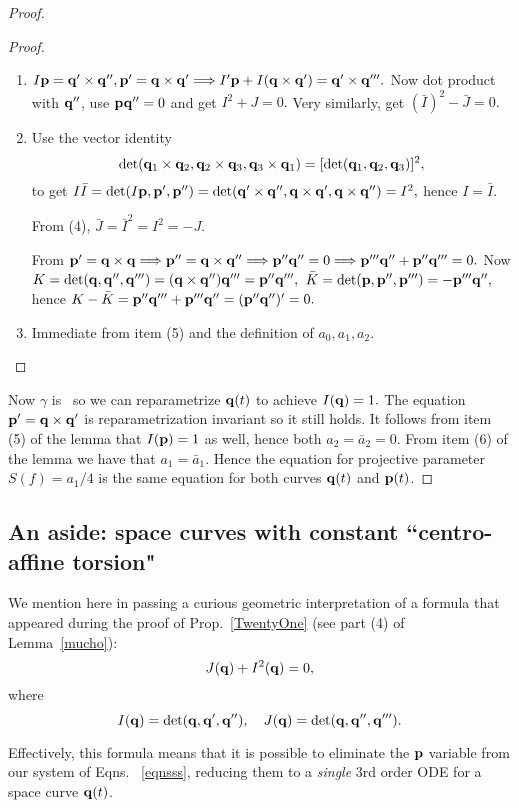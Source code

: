 \begin{proof}
\begin{proof}
\begin{enumerate}[leftmargin=18pt,label=(\arabic*)]
 \item  $I{\mathbf p}=\mathbf q'\times\mathbf q'', {\mathbf p}'=\mathbf q\times \mathbf q'\Longrightarrow I'{\mathbf p}+I(\mathbf q\times\mathbf q')=\mathbf q'\times\mathbf q'''.$ Now dot product with $\mathbf q''$, use ${\mathbf p}\mathbf q''=0$ and get $I^2+J=0.$
   Very similarly, get
   $(\bar I)^2-\bar J=0.$
   
   \item Use the vector identity
   $$\det(\mathbf q_1\times\mathbf q_2, \mathbf q_2\times \mathbf q_3,\mathbf q_3\times \mathbf q_1)=[\det(\mathbf q_1,\mathbf q_2, \mathbf q_3)]^2,$$ to get 
   $I\bar I=\det(I{\mathbf p}, {\mathbf p}',{\mathbf p}'')=\det(\mathbf q'\times\mathbf q'', \mathbf q\times\mathbf q', \mathbf q\times\mathbf q'')=I^2,$ hence
   $I=\bar I.$ 
   
   \mn From (4), $\bar J=\bar I^2=I^2=-J.$
   
   \mn From ${\mathbf p}'=\mathbf q\times \mathbf q\Longrightarrow {\mathbf p}''=\mathbf q\times \mathbf q''\Longrightarrow {\mathbf p}''\mathbf q''=0\Longrightarrow {\mathbf p}'''\mathbf q''+{\mathbf p}''\mathbf q'''=0.$
   Now $K=\det(\mathbf q, \mathbf q'', \mathbf q''')=(\mathbf q\times \mathbf q'')\mathbf q'''={\mathbf p}''\mathbf q''',$ $\bar K=\det({\mathbf p},{\mathbf p}'', {\mathbf p}''')=-{\mathbf p}'''\mathbf q'',$ hence 
   $K-\bar K={\mathbf p}''\mathbf q'''+{\mathbf p}'''\mathbf q''=({\mathbf p}''\mathbf q'')'=0.$
   
   \item Immediate from item  (5) and the definition of $a_0, a_1, a_2$. \qedhere 
  \end{enumerate}
\end{proof}

Now $\gamma$ is \lc\ so we can reparametrize $\mathbf q(t)$ to achieve $I(\mathbf q)=1.$ The equation ${\mathbf p}'=\mathbf q\times\mathbf q'$ is reparametrization invariant so it still holds. It follows from item (5) of the lemma that $I({\mathbf p})=1$ as well, hence both $a_2=\bar a_2=0.$ From item (6) of the lemma we have that $a_1=\bar a_1$. Hence the  equation for projective parameter    $S(f)=a_1/4$ is the same equation for both curves $\mathbf q(t)$ and ${\mathbf p}(t)$. \end{proof}

 \subsection{An aside: space curves with constant ``centro-affine torsion"}\label{sec:centro}
We mention here in passing a curious geometric interpretation of a formula that appeared  
during the proof of Prop.~\ref{TwentyOne} (see part (4) of Lemma~\ref{mucho}):
\begin{equation}\label{peqn}
 J(\mathbf q)+I^2(\mathbf q)=0,
 \end{equation} 
where $$I(\mathbf q)=\det(\mathbf q,\mathbf q',\mathbf q''),\quad J(\mathbf q)=\det(\mathbf q,\mathbf q'', \mathbf q''').$$  


\newcommand{\peqn}{(\ref{peqn})}


Effectively, this formula means that it is possible to eliminate the ${\mathbf p}$ variable from our system of Eqns.~   \eqref{eqnsss}, reducing them  to  a {\em single}  3rd order ODE   for a  space curve $\mathbf q(t)$. 
 


